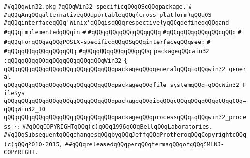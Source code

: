 \label{src/lib/std/src/win32/win32.pkg}
\verb|##qQQqwin32.pkg|\newline
\newline
\newline
\newline
\verb|#qQQqWin32-specificqQQqOSqQQqpackage.|\newline
\verb|#|\newline
\verb|#qQQqAnqQQqalternativeqQQqportableqQQq(cross-platform)qQQqOS|\newline
\verb|#qQQqinterfaceqQQq'Winix'qQQqisqQQqrespectivelyqQQqdefinedqQQqand|\newline
\verb|#qQQqimplementedqQQqin|\newline
\verb|#|\newline
\verb|#qQQqqQQqqQQqqQQqqQQq|\newline
\verb|#qQQqqQQqqQQqqQQqqQQq|\newline
\verb|#|\newline
\verb|#qQQqForqQQqaqQQqPOSIX-specificqQQqOSqQQqinterfaceqQQqsee:|\newline
\verb|#|\newline
\verb|#qQQqqQQqqQQqqQQqqQQq|\newline
\verb|#qQQqqQQqqQQqqQQqqQQq|\newline
\newline
\newline
\newline
\verb|packageqQQqwin32|\newline
\verb|:qQQqqQQqqQQqqQQqqQQqqQQqqQQqWin32|\newline
\verb|{|\newline
\verb|qQQqqQQqqQQqqQQqqQQqqQQqqQQqqQQqpackageqQQqgeneralqQQq=qQQqwin32_general|\newline
\verb|qQQqqQQqqQQqqQQqqQQqqQQqqQQqqQQqpackageqQQqfile_systemqQQq=qQQqWin32_FileSys|\newline
\verb|qQQqqQQqqQQqqQQqqQQqqQQqqQQqqQQqpackageqQQqioqQQqqQQqqQQqqQQqqQQqqQQq=qQQqWin32_IO|\newline
\verb|qQQqqQQqqQQqqQQqqQQqqQQqqQQqqQQqpackageqQQqprocessqQQq=qQQqwin32_process|\newline
\verb|};|\newline
\newline
\newline
\newline
\newline
\verb|##qQQqCOPYRIGHTqQQq(c)qQQq1996qQQqBellqQQqLaboratories.|\newline
\verb|##qQQqSubsequentqQQqchangesqQQqbyqQQqJeffqQQqProtheroqQQqCopyrightqQQq(c)qQQq2010-2015,|\newline
\verb|##qQQqreleasedqQQqperqQQqtermsqQQqofqQQqSMLNJ-COPYRIGHT.|\newline

